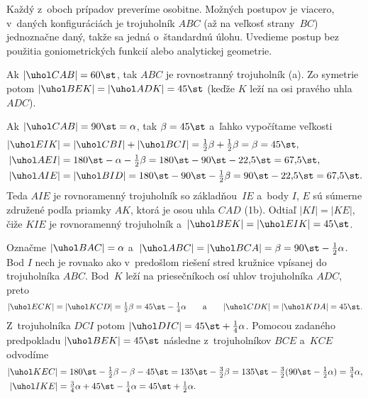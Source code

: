 {Každý z~oboch prípadov preveríme osobitne. Možných postupov je viacero, v~daných konfiguráciách je trojuholník $ABC$ (až na veľkosť strany~$BC$) jednoznačne daný, takže sa jedná o~štandardnú úlohu. Uvedieme postup bez použitia goniometrických funkcií alebo analytickej geometrie.

Ak $|\uhol CAB|=60\st$, tak $ABC$ je rovnostranný trojuholník (\obr{}a). Zo symetrie potom $|\uhol BEK|=|\uhol ADK|=45\st$ (keďže $K$ leží na osi pravého uhla $ADC$).
%

Ak $|\uhol CAB|=90\st=\alpha$, tak $\beta=45\st$ a~ľahko vypočítame veľkosti
$$
\aligned
|\uhol EIK|&=|\uhol CBI|+|\uhol BCI|=\tfrac12\beta+\tfrac12\beta=\beta=45\st,\\
|\uhol AEI|&=180\st-\alpha-\tfrac12\beta=180\st-90\st-22{,}5\st=67{,}5\st,\\
|\uhol AIE|&=|\uhol BID|=180\st-90\st-\tfrac12\beta=90\st-22{,}5\st=67{,}5\st.
\endaligned
$$
Teda $AIE$ je rovnoramenný trojuholník so základňou~$IE$ a~body $I$, $E$ sú súmerne združené podľa priamky $AK$, ktorá je osou uhla $CAD$ (\obrr1b). Odtiaľ $|KI|=|KE|$, čiže $KIE$ je rovnoramenný trojuholník a~$|\uhol BEK|=|\uhol EIK|=45\st$.

\ineriesenie
Označme $|\uhol BAC|=\alpha$ a~$|\uhol ABC|=|\uhol BCA|=\beta=90\st-\frac12\alpha$. Bod $I$ nech je rovnako ako v~predošlom riešení stred kružnice vpísanej do trojuholníka $ABC$. Bod~$K$ leží na priesečníkoch osí uhlov trojuholníka $ADC$, preto
$$
|\uhol ECK|=|\uhol KCD|=\tfrac12\beta=45\st-\tfrac14\alpha\qquad\text{a}\qquad
|\uhol CDK|=|\uhol KDA|=45\st.
$$
Z~trojuholníka $DCI$ potom $|\uhol DIC|=45\st+\frac14\alpha$. Pomocou zadaného predpokladu $|\uhol BEK|=45\st$ následne z~trojuholníkov $BCE$ a~$KCE$ odvodíme
$$
\aligned
|\uhol KEC|&=180\st-\tfrac12\beta-\beta-45\st=135\st-\tfrac32\beta=135\st-\tfrac32(90\st-\tfrac12\alpha)=\tfrac34\alpha,\\
|\uhol IKE|&=\tfrac34\alpha+45\st-\tfrac14\alpha=45\st+\tfrac12\alpha.
\endaligned
$$
%

}
